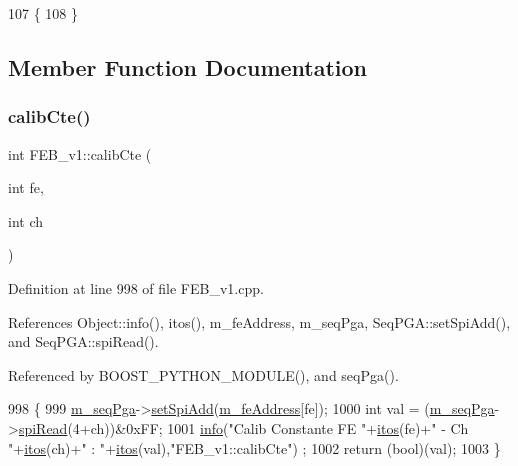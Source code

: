 \begin{DoxyCode}
107                 \{
108 \}
\end{DoxyCode}


\subsection{Member Function Documentation}
\mbox{\label{classFEB__v1_ad3893c8062c75d1f9695c196c95703c7}} 
\subsubsection{\texorpdfstring{calib\+Cte()}{calibCte()}}
{\footnotesize\ttfamily int F\+E\+B\+\_\+v1\+::calib\+Cte (\begin{DoxyParamCaption}\item[{int}]{fe,  }\item[{int}]{ch }\end{DoxyParamCaption})}



Definition at line 998 of file F\+E\+B\+\_\+v1.\+cpp.



References Object\+::info(), itos(), m\+\_\+fe\+Address, m\+\_\+seq\+Pga, Seq\+P\+G\+A\+::set\+Spi\+Add(), and Seq\+P\+G\+A\+::spi\+Read().



Referenced by B\+O\+O\+S\+T\+\_\+\+P\+Y\+T\+H\+O\+N\+\_\+\+M\+O\+D\+U\+L\+E(), and seq\+Pga().


\begin{DoxyCode}
998                                      \{
999   \hyperlink{classFEB__v1_a6c7804ac86796f233a8393043adf2e77}{m\_seqPga}->\hyperlink{classSeqPGA_ac998ce3a6d9b5f2e88cc8393f8c1df53}{setSpiAdd}(\hyperlink{classFEB__v1_a4e1945c2d5b434125f375e9d0fc6d99f}{m\_feAddress}[fe]);
1000   \textcolor{keywordtype}{int} val = (\hyperlink{classFEB__v1_a6c7804ac86796f233a8393043adf2e77}{m\_seqPga}->\hyperlink{classSeqPGA_ab3d0e5e5d4014bc7a92588a76b8713d4}{spiRead}(4+ch))&0xFF;
1001   \hyperlink{classObject_a644fd329ea4cb85f54fa6846484b84a8}{info}(\textcolor{stringliteral}{"Calib Constante FE "}+\hyperlink{Tools_8h_af330027dbdafb9a30768b3613c553e60}{itos}(fe)+\textcolor{stringliteral}{" - Ch "}+\hyperlink{Tools_8h_af330027dbdafb9a30768b3613c553e60}{itos}(ch)+\textcolor{stringliteral}{" : "}+\hyperlink{Tools_8h_af330027dbdafb9a30768b3613c553e60}{itos}(val),\textcolor{stringliteral}{"FEB\_v1::calibCte"})
      ;
1002   \textcolor{keywordflow}{return} (\textcolor{keywordtype}{bool})(val);
1003 \}
\end{DoxyCode}
\mbox{\label{classFEB__v1_a8518757e40b372f784674da1a2c41091}} 
